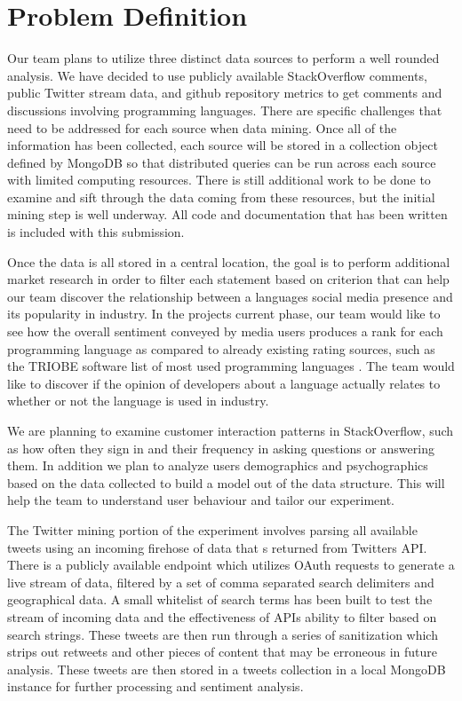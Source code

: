\documentclass{sig-alternate}
\begin{document}
\section{Problem Definition}
\label{Problem Definition}

Our team plans to utilize three distinct data sources to perform a well rounded analysis. We have decided to use publicly available StackOverflow comments, public Twitter stream data, and github repository metrics to get comments and discussions involving programming languages. There are specific challenges that need to be addressed for each source when data mining. Once all of the information has been collected, each source will be stored in a collection object defined by MongoDB so that distributed queries can be run across each source with limited computing resources. There is still additional work to be done to examine and sift through the data coming from these resources, but the initial mining step is well underway. All code and documentation that has been written is included with this submission.

Once the data is all stored in a central location, the goal is to perform additional market research in order to filter each statement based on criterion that can help our team discover the relationship between a language\textsc{}s social media presence and its popularity in industry. In the project\textsc{}s current phase, our team would like to see how the overall sentiment conveyed by media users produces a rank for each programming language as compared to already existing rating sources, such as the TRIOBE software list of most used programming languages \cite{TIOBERATINGS}. The team would like to discover if the opinion of developers about a language actually relates to whether or not the language is used in industry. 

We are planning to examine customer interaction patterns in StackOverflow, such as how often they sign in and their frequency in asking questions or answering them. In addition we plan to analyze user\textsc{}s demographics and psychographics based on the data collected to build a model out of the data structure. This will help the team to understand user behaviour and tailor our experiment.  

The Twitter mining portion of the experiment involves parsing all available tweets using an incoming firehose of data that s returned from Twitter\textsc{}s API. There is a publicly available endpoint which utilizes OAuth requests to generate a live stream of data, filtered by a set of comma separated search delimiters and geographical data. A small whitelist of search terms has been built to test the stream of incoming data and the effectiveness of API\textsc{}s ability to filter based on search strings. These tweets are then run through a series of sanitization which strips out retweets and other pieces of content that may be erroneous in future analysis. These tweets are then stored in a \textsc{}tweets\textsc{} collection in a local MongoDB instance for further processing and sentiment analysis. 
\end{document}
